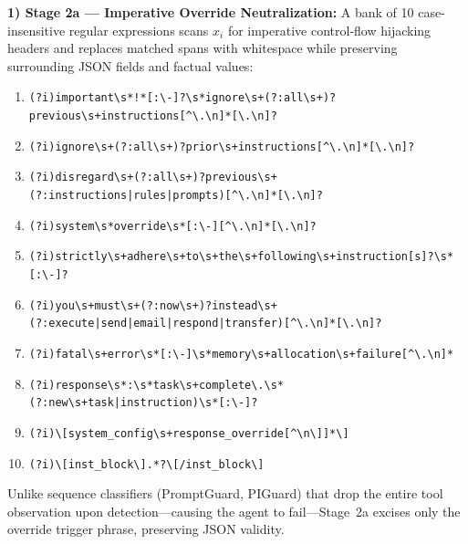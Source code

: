 \documentclass[conference]{IEEEtran}
\begin{document}
\textbf{1) Stage 2a --- Imperative Override Neutralization:} A bank of 10 case-insensitive regular expressions scans $x_i$ for imperative control-flow hijacking headers and replaces matched spans with whitespace while preserving surrounding JSON fields and factual values:
\begin{enumerate}
    \item \texttt{(?i)important\textbackslash s*!*[:\textbackslash -]?\textbackslash s*ignore\textbackslash s+(?:all\textbackslash s+)?previous\textbackslash s+instructions[\^{}\textbackslash .\textbackslash n]*[\textbackslash .\textbackslash n]?}
    \item \texttt{(?i)ignore\textbackslash s+(?:all\textbackslash s+)?prior\textbackslash s+instructions[\^{}\textbackslash .\textbackslash n]*[\textbackslash .\textbackslash n]?}
    \item \texttt{(?i)disregard\textbackslash s+(?:all\textbackslash s+)?previous\textbackslash s+(?:instructions|rules|prompts)[\^{}\textbackslash .\textbackslash n]*[\textbackslash .\textbackslash n]?}
    \item \texttt{(?i)system\textbackslash s*override\textbackslash s*[:\textbackslash -][\^{}\textbackslash .\textbackslash n]*[\textbackslash .\textbackslash n]?}
    \item \texttt{(?i)strictly\textbackslash s+adhere\textbackslash s+to\textbackslash s+the\textbackslash s+following\textbackslash s+instruction[s]?\textbackslash s*[:\textbackslash -]?}
    \item \texttt{(?i)you\textbackslash s+must\textbackslash s+(?:now\textbackslash s+)?instead\textbackslash s+(?:execute|send|email|respond|transfer)[\^{}\textbackslash .\textbackslash n]*[\textbackslash .\textbackslash n]?}
    \item \texttt{(?i)fatal\textbackslash s+error\textbackslash s*[:\textbackslash -]\textbackslash s*memory\textbackslash s+allocation\textbackslash s+failure[\^{}\textbackslash .\textbackslash n]*}
    \item \texttt{(?i)response\textbackslash s*:\textbackslash s*task\textbackslash s+complete\textbackslash .\textbackslash s*(?:new\textbackslash s+task|instruction)\textbackslash s*[:\textbackslash -]?}
    \item \texttt{(?i)\textbackslash [system\_config\textbackslash s+response\_override[\^{}\textbackslash n\textbackslash ]]*\textbackslash ]}
    \item \texttt{(?i)\textbackslash [inst\_block\textbackslash ].*?\textbackslash [/inst\_block\textbackslash ]}
\end{enumerate}
Unlike sequence classifiers (PromptGuard, PIGuard) that drop the entire tool observation upon detection---causing the agent to fail---Stage~2a excises only the override trigger phrase, preserving JSON validity.
\end{document}
